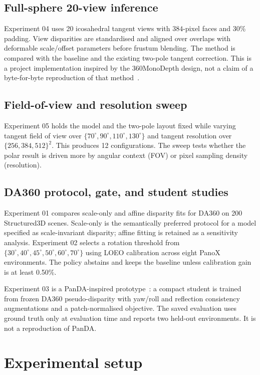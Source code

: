 \documentclass{article}
\begin{document}
\subsection{Full-sphere 20-view inference}

Experiment 04 uses 20 icosahedral tangent views with $384$-pixel faces and 30\% padding. View disparities are standardised and aligned over overlaps with deformable scale/offset parameters before frustum blending. The method is compared with the baseline and the existing two-pole tangent correction. This is a project implementation inspired by the 360MonoDepth design, not a claim of a byte-for-byte reproduction of that method~\citep{rey2022}.

\subsection{Field-of-view and resolution sweep}

Experiment 05 holds the model and the two-pole layout fixed while varying tangent field of view over $\{70^\circ,90^\circ,110^\circ,130^\circ\}$ and tangent resolution over $\{256,384,512\}^2$. This produces 12 configurations. The sweep tests whether the polar result is driven more by angular context (FOV) or pixel sampling density (resolution).

\subsection{DA360 protocol, gate, and student studies}

Experiment 01 compares scale-only and affine disparity fits for DA360 on 200 Structured3D scenes. Scale-only is the semantically preferred protocol for a model specified as scale-invariant disparity; affine fitting is retained as a sensitivity analysis. Experiment 02 selects a rotation threshold from $\{30^\circ,40^\circ,45^\circ,50^\circ,60^\circ,70^\circ\}$ using LOEO calibration across eight PanoX environments. The policy abstains and keeps the baseline unless calibration gain is at least 0.50\%.

Experiment 03 is a PanDA-inspired prototype~\citep{cao2024panda}: a compact student is trained from frozen DA360 pseudo-disparity with yaw/roll and reflection consistency augmentations and a patch-normalised objective. The saved evaluation uses ground truth only at evaluation time and reports two held-out environments. It is not a reproduction of PanDA.

\section{Experimental setup}
\end{document}
